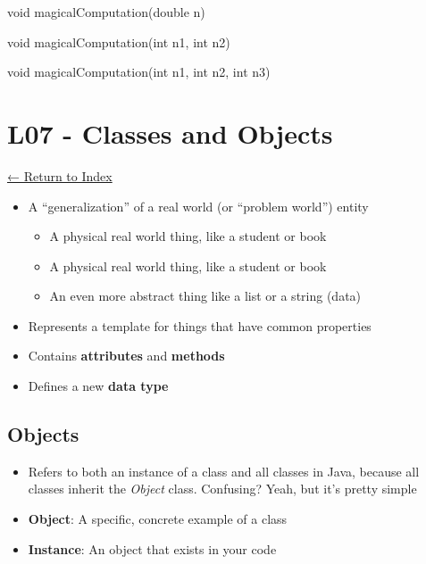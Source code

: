 \documentclass[]{article}
\newenvironment{Shaded}{}{}
\newcommand{\DataTypeTok}[1]{\textcolor[rgb]{0.56,0.13,0.00}{#1}}
\newcommand{\FunctionTok}[1]{\textcolor[rgb]{0.02,0.16,0.49}{#1}}
\newcommand{\NormalTok}[1]{#1}
\providecommand{\tightlist}{%
  \setlength{\itemsep}{0pt}\setlength{\parskip}{0pt}}
\begin{document}
\begin{Shaded}
\begin{Highlighting}[]
\DataTypeTok{void} \FunctionTok{magicalComputation}\NormalTok{(}\DataTypeTok{double}\NormalTok{ n)}

\DataTypeTok{void} \FunctionTok{magicalComputation}\NormalTok{(}\DataTypeTok{int}\NormalTok{ n1, }\DataTypeTok{int}\NormalTok{ n2)}

\DataTypeTok{void} \FunctionTok{magicalComputation}\NormalTok{(}\DataTypeTok{int}\NormalTok{ n1, }\DataTypeTok{int}\NormalTok{ n2, }\DataTypeTok{int}\NormalTok{ n3)}
\end{Highlighting}
\end{Shaded}

\hypertarget{l07---classes-and-objects}{%
\section{L07 - Classes and Objects}\label{l07---classes-and-objects}}

\protect\hyperlink{table-of-contents}{← Return to Index}

\begin{itemize}
\tightlist
\item
  A ``generalization'' of a real world (or ``problem world'') entity

  \begin{itemize}
  \tightlist
  \item
    A physical real world thing, like a student or book
  \item
    A physical real world thing, like a student or book
  \item
    An even more abstract thing like a list or a string (data)
  \end{itemize}
\item
  Represents a template for things that have common properties
\item
  Contains \textbf{attributes} and \textbf{methods}
\item
  Defines a new \textbf{data type}
\end{itemize}

\hypertarget{objects}{%
\subsection{Objects}\label{objects}}

\begin{itemize}
\item
  Refers to both an instance of a class and all classes in Java, because
  all classes inherit the \emph{Object} class. Confusing? Yeah, but it's
  pretty simple
\item
  \textbf{Object}: A specific, concrete example of a class
\item
  \textbf{Instance}: An object that exists in your code
\end{itemize}
\end{document}
